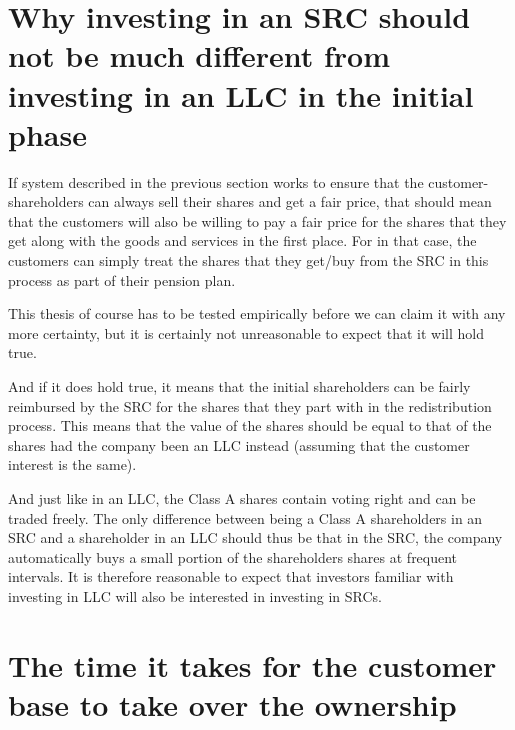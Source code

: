 \documentclass{article}
\begin{document}




\section{Why investing in an SRC should not be much different from investing in an LLC in the initial phase}
\label{sect_thesis}

If system described in the previous section works to ensure that the customer-shareholders can always sell their shares and get a fair price, that should mean that the customers will also be willing to pay a fair price for the shares that they get along with the goods and services in the first place. For in that case, the customers can simply treat the shares that they get/buy from the SRC in this process as part of their pension plan. 

This thesis of course has to be tested empirically before we can claim it with any more certainty, but it is certainly not unreasonable to expect that it will hold true.

And if it does hold true, it means that the initial shareholders can be fairly reimbursed by the SRC for the shares that they part with in the redistribution process. This means that the value of the shares should be equal to that of the shares had the company been an LLC instead (assuming that the customer interest is the same). 

And just like in an LLC, the Class A shares contain voting right and can be traded freely. The only difference between being a Class A shareholders in an SRC and a shareholder in an LLC should thus be that in the SRC, the company automatically buys a small portion of the shareholders shares at frequent intervals. It is therefore reasonable to expect that investors familiar with investing in LLC will also be interested in investing in SRCs. 



\section{The time it takes for the customer base to take over the ownership}
\end{document}

